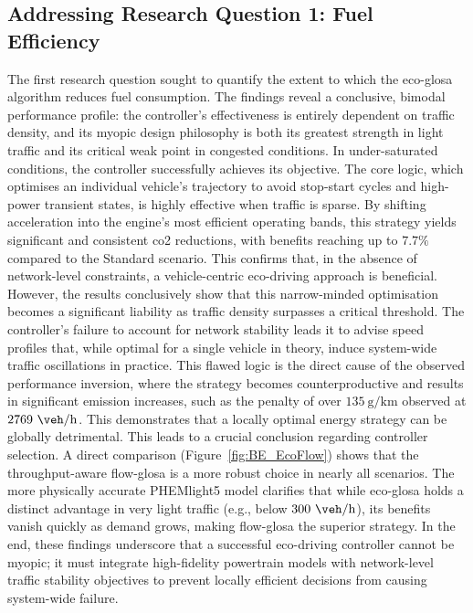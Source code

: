 \subsection*{Addressing Research Question 1: Fuel Efficiency}
The first research question sought to quantify the extent to which the \ac{eco-glosa} algorithm reduces fuel consumption. The findings reveal a conclusive, bimodal performance profile: the controller's effectiveness is entirely dependent on traffic density, and its myopic design philosophy is both its greatest strength in light traffic and its critical weak point in congested conditions.
\mynewline
In under-saturated conditions, the controller successfully achieves its objective. The core logic, which optimises an individual vehicle's trajectory to avoid stop-start cycles and high-power transient states, is highly effective when traffic is sparse. By shifting acceleration into the engine's most efficient operating bands, this strategy yields significant and consistent \ac{co2} reductions, with benefits reaching up to $7.7\%$ compared to the Standard scenario. This confirms that, in the absence of network-level constraints, a vehicle-centric eco-driving approach is beneficial.
\mynewline
However, the results conclusively show that this narrow-minded optimisation becomes a significant liability as traffic density surpasses a critical threshold. The controller's failure to account for network stability leads it to advise speed profiles that, while optimal for a single vehicle in theory, induce system-wide traffic oscillations in practice. This flawed logic is the direct cause of the observed performance inversion, where the strategy becomes counterproductive and results in significant emission increases, such as the penalty of over $135~\unit{\gram\per\kilo\metre}$ observed at $2769~\unit{\veh\per\hour}$. This demonstrates that a locally optimal energy strategy can be globally detrimental.
\mynewline
This leads to a crucial conclusion regarding controller selection. A direct comparison (Figure~\vref{fig:BE_EcoFlow}) shows that the throughput-aware \ac{flow-glosa} is a more robust choice in nearly all scenarios. The more physically accurate PHEMlight5 model clarifies that while \ac{eco-glosa} holds a distinct advantage in very light traffic (e.g., below $300~\unit{\veh\per\hour}$), its benefits vanish quickly as demand grows, making \ac{flow-glosa} the superior strategy. In the end, these findings underscore that a successful eco-driving controller cannot be myopic; it must integrate high-fidelity powertrain models with network-level traffic stability objectives to prevent locally efficient decisions from causing system-wide failure.

